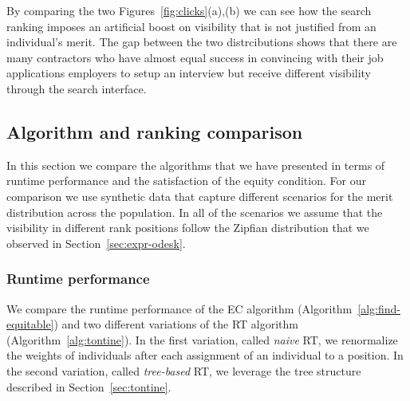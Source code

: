 \documentclass[prodmode,acmec]{acmsmall}
\begin{document}
By comparing the two Figures~\ref{fig:clicks}(a),(b) we can see how
the search ranking imposes an artificial boost on visibility that is
not justified from an individual's merit.  The gap between the two
distrcibutions shows that there are many contractors who have almost
equal success in convincing with their job applications employers to
setup an interview but receive different visibility through the search
interface.


\subsection{Algorithm and ranking comparison}
\label{sec:expr-comparison}
In this section we compare the algorithms that we have presented in
terms of runtime performance and the satisfaction of the equity
condition. For our comparison we use synthetic data that capture
different scenarios for the merit distribution across the
population. In all of the scenarios we assume that the visibility in
different rank positions follow the Zipfian distribution that we
observed in Section~\ref{sec:expr-odesk}.


\subsubsection{Runtime performance}
\label{sec:expr-runtime}

We compare the runtime performance of the EC algorithm
(Algorithm~\ref{alg:find-equitable}) and two different variations of
the RT algorithm (Algorithm~\ref{alg:tontine}). In the first
variation, called \emph{naive} RT, we renormalize the weights of
individuals after each assignment of an individual to a position. In
the second variation, called \emph{tree-based} RT, we leverage the
tree structure described in Section~\ref{sec:tontine}.
\end{document}
